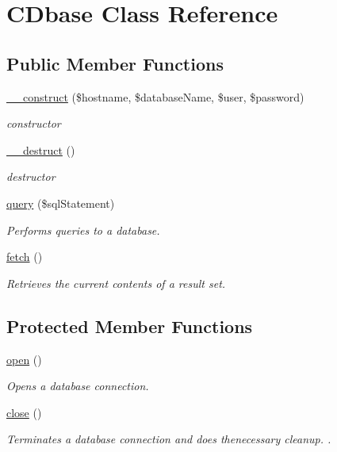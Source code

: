 \hypertarget{class_c_dbase}{\section{C\+Dbase Class Reference}
\label{class_c_dbase}
}
\subsection*{Public Member Functions}
\begin{DoxyCompactItemize}
\item 
\hyperlink{class_c_dbase_a964d3bd23db1022d52ec1ca90088701b}{\+\_\+\+\_\+construct} (\$hostname, \$database\+Name, \$user, \$password)
\begin{DoxyCompactList}\small\item\em constructor \end{DoxyCompactList}\item 
\hyperlink{class_c_dbase_a421831a265621325e1fdd19aace0c758}{\+\_\+\+\_\+destruct} ()
\begin{DoxyCompactList}\small\item\em destructor \end{DoxyCompactList}\item 
\hyperlink{class_c_dbase_ae123810f3cb0d1e91a6fedc1ee032dcf}{query} (\$sql\+Statement)
\begin{DoxyCompactList}\small\item\em Performs queries to a database. \end{DoxyCompactList}\item 
\hyperlink{class_c_dbase_ae48cc10bd727774bb36203986ce3b176}{fetch} ()
\begin{DoxyCompactList}\small\item\em Retrieves the current contents of a result set. \end{DoxyCompactList}\end{DoxyCompactItemize}
\subsection*{Protected Member Functions}
\begin{DoxyCompactItemize}
\item 
\hyperlink{class_c_dbase_a44a2ac59a3b91f8c18905dce700934d6}{open} ()
\begin{DoxyCompactList}\small\item\em Opens a database connection. \end{DoxyCompactList}\item 
\hyperlink{class_c_dbase_aa69c8bf1f1dcf4e72552efff1fe3e87e}{close} ()
\begin{DoxyCompactList}\small\item\em Terminates a database connection and does thenecessary cleanup. . \end{DoxyCompactList}\end{DoxyCompactItemize}
